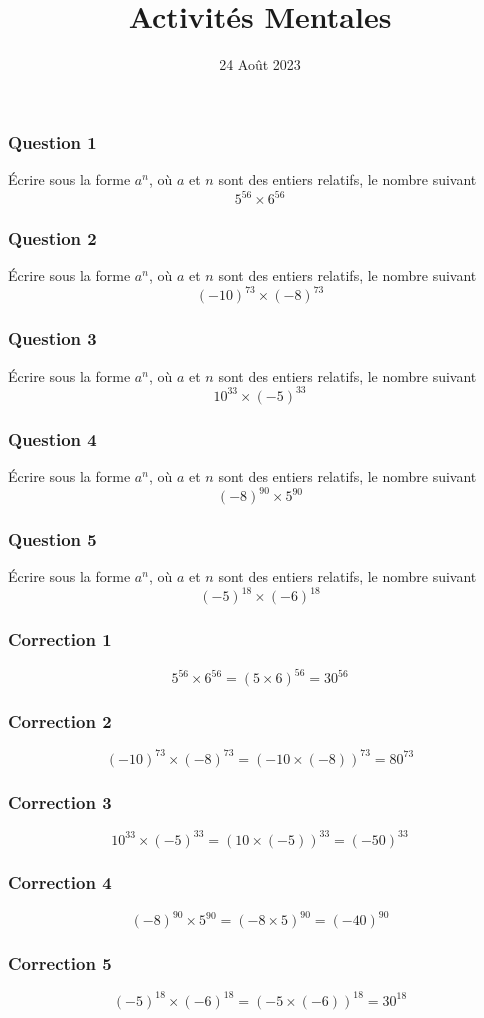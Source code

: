 \documentclass[15pt, mathserif]{beamer}
\title{Activités Mentales}
\date{24 Août 2023}
\begin{document}
\begin{frame}
    \titlepage
\end{frame}

\begin{frame} 
	\frametitle{Question 1}
	Écrire sous la forme $a^n$, où $a$ et $n$ sont des entiers relatifs, le nombre suivant $$5^{56} \times 6^{56}$$\end{frame}


\begin{frame} 
	\frametitle{Question 2}
	Écrire sous la forme $a^n$, où $a$ et $n$ sont des entiers relatifs, le nombre suivant $$\left(-10\right)^{73} \times \left(-8\right)^{73}$$\end{frame}


\begin{frame} 
	\frametitle{Question 3}
	Écrire sous la forme $a^n$, où $a$ et $n$ sont des entiers relatifs, le nombre suivant $$10^{33} \times \left(-5\right)^{33}$$\end{frame}


\begin{frame} 
	\frametitle{Question 4}
	Écrire sous la forme $a^n$, où $a$ et $n$ sont des entiers relatifs, le nombre suivant $$\left(-8\right)^{90} \times 5^{90}$$\end{frame}


\begin{frame} 
	\frametitle{Question 5}
	Écrire sous la forme $a^n$, où $a$ et $n$ sont des entiers relatifs, le nombre suivant $$\left(-5\right)^{18} \times \left(-6\right)^{18}$$\end{frame}


\begin{frame}
\vspace{-10mm}
	\frametitle{Correction 1}
$$5^{56} \times 6^{56}=(5\times 6)^{56}=30^{56}$$\end{frame}


\begin{frame}
\vspace{-10mm}
	\frametitle{Correction 2}
$$\left(-10\right)^{73} \times \left(-8\right)^{73}=(-10\times \left(-8\right))^{73}=80^{73}$$\end{frame}


\begin{frame}
\vspace{-10mm}
	\frametitle{Correction 3}
$$10^{33} \times \left(-5\right)^{33}=(10\times \left(-5\right))^{33}=\left(-50\right)^{33}$$\end{frame}


\begin{frame}
\vspace{-10mm}
	\frametitle{Correction 4}
$$\left(-8\right)^{90} \times 5^{90}=(-8\times 5)^{90}=\left(-40\right)^{90}$$\end{frame}


\begin{frame}
\vspace{-10mm}
	\frametitle{Correction 5}
$$\left(-5\right)^{18} \times \left(-6\right)^{18}=(-5\times \left(-6\right))^{18}=30^{18}$$\end{frame}
\end{document}
